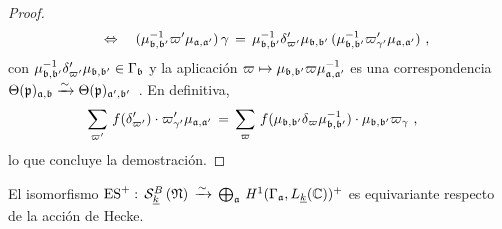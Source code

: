 \begin{proof}
\begin{align*}
			\quad\Leftrightarrow\quad
		(\mu_{\frak{b},\frak{b}'}^{-1}\varpi'\mu_{\frak{a},\frak{a}'})
			\,\gamma\,=\,
		\mu_{\frak{b},\frak{b}'}^{-1}\delta_{\varpi'}'
			\mu_{\frak{b},\frak{b}'}\,
			(\mu_{\frak{b},\frak{b}'}^{-1}\varpi_{\gamma'}'
				\mu_{\frak{a},\frak{a}'})
		\text{ ,}
	\end{align*}
	con
	\begin{math}
		\mu_{\frak{b},\frak{b}'}^{-1}\delta_{\varpi'}'
			\mu_{\frak{b},\frak{b}'}\in\Gamma_{\frak{b}}
	\end{math}
	y la aplicaci\'{o}n
	\begin{math}
		\varpi\mapsto\mu_{\frak{b},\frak{b}'}\varpi
			\mu_{\frak{a},\frak{a}'}^{-1}
	\end{math}
	es una correspondencia
	\begin{math}
		\Theta(\frak{p})_{\frak{a},\frak{b}}\xrightarrow{\sim}
			\Theta(\frak{p})_{\frak{a}',\frak{b}'}
	\end{math}~.
	En definitiva,
	\begin{align*}
		\sum_{\varpi'}\,f(\delta_{\varpi'}')\cdot\varpi_{\gamma'}'
			\mu_{\frak{a},\frak{a}'} & \,=\,
			\sum_{\varpi}\,
				f(\mu_{\frak{b},\frak{b}'}\delta_{\varpi}
			\mu_{\frak{b},\frak{b}'}^{-1})\cdot
			\mu_{\frak{b},\frak{b}'}\varpi_{\gamma}
		\text{ ,}
	\end{align*}
	lo que concluye la demostraci\'{o}n.
\end{proof}

\begin{coroEichlerShimura}\label{coro:eichlershimura}
	El isomorfismo
	\begin{math}
		\ES^{+} :\,\spitzH[B]{k}{\frak{N}}\,\xrightarrow{\sim}\,
		\bigoplus_{\frak{a}}\,\cohomolo[1]{%
			\Gamma_{\frak{a}},L_{\peso{k}}(\bb{C})}^{+}
	\end{math}
	es equivariante respecto de la acci\'{o}n de Hecke.
\end{coroEichlerShimura}
%

